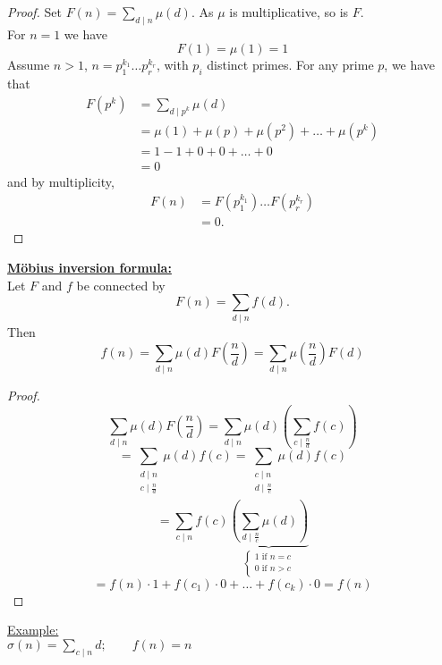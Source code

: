 \documentclass{report}
\begin{document}
\begin{proof}
				Set $F(n)=\sum_{d \mid n} \mu(d)$. As $\mu$ is multiplicative, so is $F$.\\
				For $n=1$ we have \[ F(1)= \mu(1)=1\]
				Assume $n>1$, $n=p_1^{k_1} \dots p_r^{k_r}$, with $p_i$ distinct primes. For any prime $p$, we have that \begin{equation*}
				\begin{aligned}
				F(p^k)&=\sum_{d \mid p^k} \mu(d)\\
				&= \mu(1) + \mu(p) + \mu(p^2) + \dots + \mu(p^k)\\
				&= 1 -1 + 0 + 0 + \dots + 0\\
				&=0
				\end{aligned}
				\end{equation*}
				and by multiplicity, \begin{equation*}
				\begin{aligned}
				F(n)&=F(p_1^{k_1}) \dots F(p_r^{k_r})\\
				&=0.
				\end{aligned}
				\end{equation*}
\end{proof}
\textbf{\underline{M\"{o}bius inversion formula:}}\\
Let $F$ and $f$ be connected by \[F(n)=\sum_{d \mid n} f(d).\]
Then 
\[ f(n)=\sum_{d\mid n} \mu(d) F(\frac{n}{d}) = \sum_{d \mid n} \mu(\frac{n}{d}) F(d)\]
\begin{proof}
				\[ \sum_{d\mid n} \mu(d) F(\frac{n}{d}) = \sum_{d \mid n} \mu(d)(\sum_{c\mid \frac{n}{d}} f(c))\]
				\[ = \sum_{\substack{
													d\mid n\\
													c\mid \frac{n}{d}\\}}
						\mu(d) f(c)= \sum_{\substack{
													c\mid n\\
													d\mid \frac{n}{c}\\}}
						\mu(d) f(c)
													\]
				\[ = \sum_{c \mid n} f(c)\underbrace{(\sum_{d \mid \frac{n}{c}} \mu(d))}_{\left \{
										\begin{array}{ccc}
										1 \text{ if } n=c\\
										0 \text{ if } n>c\\
										\end{array}
							\right.}
				\]
				\[=f(n)\cdot 1 +f(c_1)\cdot 0+ \dots +f(c_k) \cdot 0 = f(n)\]
\end{proof}
\underline{Example:} \\
$\sigma(n) = \sum_{c \mid n} d ; \qquad f(n)=n$\\
\end{document}
